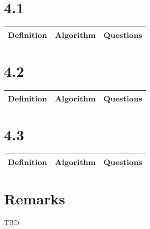 \documentclass{article}
\begin{document}
\section*{4.1}

\begin{tabularx}{\textwidth}{ |X|X|X| }
    \hline
	{\bf Definition} & {\bf Algorithm} & {\bf Questions} \\
    \hline
\end{tabularx}

\section*{4.2}

\begin{tabularx}{\textwidth}{ |X|X|X| }
    \hline
	{\bf Definition} & {\bf Algorithm} & {\bf Questions} \\
    \hline
\end{tabularx}

\section*{4.3}

\begin{tabularx}{\textwidth}{ |X|X|X| }
    \hline
	{\bf Definition} & {\bf Algorithm} & {\bf Questions} \\
    \hline
\end{tabularx}

\section*{Remarks}

TBD
\end{document}
